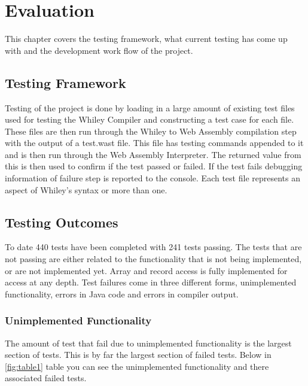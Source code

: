 \chapter{Evaluation}\label{C:t}

This chapter covers the testing framework, what current testing has come up with and the development work flow of the project.

\section{Testing Framework}

Testing of the project is done by loading in a large amount of existing test files used for testing the Whiley Compiler and constructing a test case for each file. These files are then run through the Whiley to Web Assembly compilation step with the output of a test.wast file. This file has testing commands appended to it and is then run through the Web Assembly Interpreter. %
The returned value from this is then used to confirm if the test passed or failed. If the test fails debugging information of failure step is reported to the console. Each test file represents an aspect of Whiley's syntax or more than one.  

\section{Testing Outcomes}

To date 440 tests have been completed with 241 tests passing. The tests that are not passing are either related to the functionality that is not being implemented, or are not implemented yet. Array and record access is fully implemented for access at any depth. Test failures come in three different forms, unimplemented functionality, errors in Java code and errors in compiler output.

\subsection{Unimplemented Functionality}

The amount of test that fail due to unimplemented functionality is the largest section of tests. %
This is by far the largest section of failed tests. Below in \ref{fig:table1} table you can see the unimplemented functionality and there associated failed tests. 

